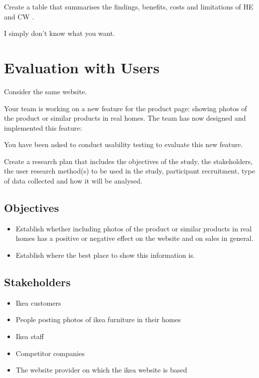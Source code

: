 \documentclass[10pt,\jkfside,a4paper]{article}
\begin{document}
Create a table that summarises the findings, benefits, costs and limitations of HE and CW .


I simply don't know what you want.

\section{Evaluation with Users}

Consider the same website.

Your team is working on a new feature for the product page: showing photos of the product or similar products in real
homes. The team has now designed and implemented this feature:

You have been asked to conduct usability testing to evaluate this new feature.

Create a research plan that includes the objectives of the study, the stakeholders, the user research method(s)
to be used in the study, participant recruitment, type of data collected and how it will be analysed.

\subsection*{Objectives}

\begin{itemize}

\item Establish whether including photos of the product or similar products in real
homes has a positive or negative effect on the website and on sales in general.

\item Establish where the best place to show this information is.

\end{itemize}

\subsection*{Stakeholders}

\begin{itemize}

\item Ikea customers

\item People posting photos of ikea furniture in their homes

\item Ikea staff

\item Competitor companies

\item The website provider on which the ikea website is based

\end{itemize}
\end{document}
